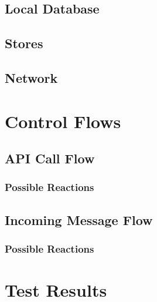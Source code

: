 \subsection{Local Database}
\subsection{Stores}
\subsection{Network}

\section{Control Flows}
\subsection{API Call Flow}
\subsubsection{Possible Reactions}
\subsection{Incoming Message Flow}
\subsubsection{Possible Reactions}


\section{Test Results}